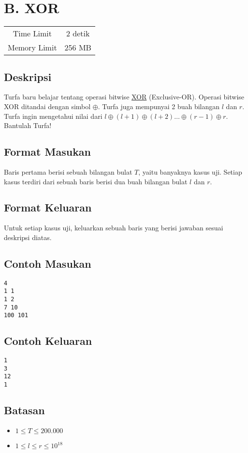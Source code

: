\documentclass{article}
\begin{document}
\section*{\hfil B. XOR\hfil}

\begin{center}
\begin{tabular}{ |cc| } 
 \hline
 Time Limit & 2 detik \\ 
 Memory Limit & 256 MB \\
 \hline
\end{tabular}
\end{center}

\subsection*{Deskripsi}
\par Turfa baru belajar tentang operasi bitwise \href{https://en.wikipedia.org/wiki/Exclusive_or}{XOR} (Exclusive-OR). Operasi bitwise XOR ditandai dengan simbol $\oplus$. Turfa juga mempunyai 2 buah bilangan $l$ dan $r$. Turfa ingin mengetahui nilai dari $l \oplus (l + 1) \oplus (l + 2) \dots \oplus (r - 1) \oplus r$. Bantulah Turfa!

\subsection*{Format Masukan}
\par Baris pertama berisi sebuah bilangan bulat $T$, yaitu banyaknya kasus uji.
\newline Setiap kasus terdiri dari sebuah baris berisi dua buah bilangan bulat $l$ dan $r$.

\subsection*{Format Keluaran}

\par Untuk setiap kasus uji, keluarkan sebuah baris yang berisi jawaban sesuai deskripsi diatas. 

\subsection*{Contoh Masukan}

\begin{lstlisting}
4
1 1
1 2
7 10
100 101

\end{lstlisting}

\subsection*{Contoh Keluaran}

\begin{lstlisting}
1
3
12
1

\end{lstlisting}

\subsection*{Batasan}

\begin{itemize}
	\item $1 \leq T\leq 200.000$
	\item $1 \leq l \leq r \leq 10^{18}$
\end{itemize}
\end{document}
